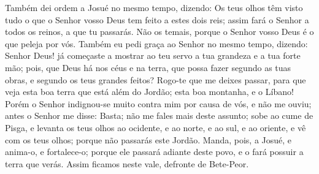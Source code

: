 Também dei ordem a Josué no mesmo tempo, dizendo: Os teus olhos
têm visto tudo o que o Senhor vosso Deus tem feito a estes dois
reis; assim fará o Senhor a todos os reinos, a que tu passarás.
Não os temais, porque o Senhor vosso Deus é o que peleja por
vós. Também eu pedi graça ao Senhor no mesmo tempo, dizendo:
Senhor Deus! já começaste a mostrar ao teu servo a tua
grandeza e a tua forte mão; pois, que Deus há nos céus e na terra,
que possa fazer segundo as tuas obras, e segundo os teus grandes
feitos? Rogo-te que me deixes passar, para que veja esta boa
terra que está além do Jordão; esta boa montanha, e o Líbano!
Porém o Senhor indignou-se muito contra mim por causa de vós,
e não me ouviu; antes o Senhor me disse: Basta; não me fales mais
deste assunto; sobe ao cume de Pisga, e levanta os teus olhos
ao ocidente, e ao norte, e ao sul, e ao oriente, e vê com os teus
olhos; porque não passarás este Jordão. Manda, pois, a Josué,
e anima-o, e fortalece-o; porque ele passará adiante deste povo, e o
fará possuir a terra que verás. Assim ficamos neste vale,
defronte de Bete-Peor.

\medskip

